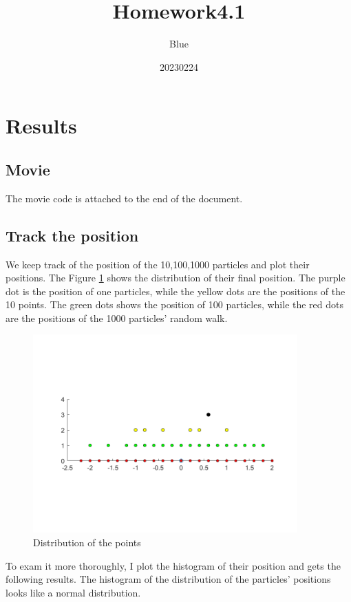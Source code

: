 \documentclass{article}
\title{Homework4.1}
\author{Blue}
\date{20230224}
\begin{document}
\maketitle
\section{Results}
\subsection{Movie}
The movie code is attached to the end of the document.
\subsection{Track the position}
We keep track of the position of the 10,100,1000 particles and plot their positions. The Figure \ref{figure1} shows the distribution of their final position. The purple dot is the position of one particles, while the yellow dots are the positions of the 10 points. The green dots shows the position of 100 particles, while the red dots are the positions of the 1000 particles' random walk.
\begin{figure}[H]
\centering
\includegraphics[width=4.00in,height=3.00in]{Distribution.png} 
\caption{Distribution of the points}
\label{figure1}
\end{figure}
To exam it more thoroughly, I plot the histogram of their position and gets the following results. The histogram of the distribution of the particles' positions looks like a normal distribution.
\clearpage
\end{document}

